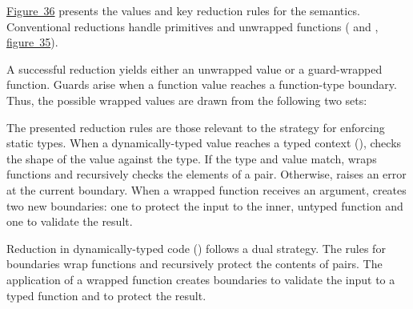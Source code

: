 \documentclass[ twoside,open=right,titlepage,numbers=noenddot,headinclude,%
                footinclude=true,cleardoublepage=empty,abstract=off,
                BCOR=5mm,paper=a4,fontsize=11pt,%
                ngerman,american,%
                parts,pdfspacing]{scrreprt}
\newcommand{\FigureRef}[2]{#1}
\begin{document}
\hyperref[t:x28counter_x28x22figurex22_x22figx3anaturalx2dreductionx22x29x29]{Figure~\FigureRef{36}{t:x28counter_x28x22figurex22_x22figx3anaturalx2dreductionx22x29x29}} presents the values and key reduction rules
 for the \relax{\nname} semantics.
Conventional reductions handle primitives and unwrapped functions
  (\relax{$\snreddyn$} and \relax{$\snredsta$}, \hyperref[t:x28counter_x28x22figurex22_x22figx3acommonx2dreductionx22x29x29]{figure~\FigureRef{35}{t:x28counter_x28x22figurex22_x22figx3acommonx2dreductionx22x29x29}}).

A successful \relax{\nname} reduction yields either an unwrapped value or
 a guard{-}wrapped function.
Guards arise when a function value reaches a function{-}type boundary.
Thus, the possible wrapped values are drawn from the following two sets:


The presented reduction rules are those relevant to the \relax{\nname} strategy for
 enforcing static types.
When a dynamically{-}typed value reaches a typed context (\relax{$\sdyn$}),
 \relax{\nname} checks the shape of the value against the type.
If the type and value match, \relax{\nname} wraps functions
 and recursively checks the elements of a pair.
Otherwise, \relax{\nname} raises an error at the current boundary.
When a wrapped function receives an argument, \relax{\nname}
 creates two new boundaries:
 one to protect the input to the inner, untyped function
 and one to validate the result.

Reduction in dynamically{-}typed code (\relax{$\nredND$}) follows a dual strategy.
The rules for \relax{$\ssta$} boundaries wrap functions and recursively protect
 the contents of pairs.
The application of a wrapped function creates boundaries to validate
 the input to a typed function and to protect the result.
\end{document}
